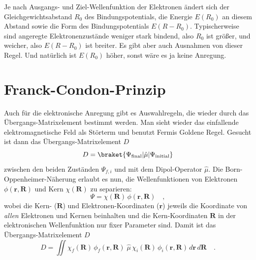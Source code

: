 Je nach Ausgangs- und Ziel-Wellenfunktion der Elektronen ändert sich der Gleichgewichtsabstand $R_0$ des Bindungspotentials,  die Energie $E(R_0)$ an diesem 
Abstand sowie die Form des Bindungspotentials $E(R- R_0)$. Typischerweise  sind angeregte Elektronenzustände weniger stark bindend, also $R_0$ ist größer, und weicher, also $E(R- R_0)$ ist breiter. Es gibt aber auch Ausnahmen von dieser Regel.
Und natürlich ist $E(R_0)$ höher, sonst wäre es ja keine Anregung.

\section{Franck-Condon-Prinzip}


Auch für die elektronische Anregung gibt es Auswahlregeln, die wieder durch das Übergangs-Matrixelement bestimmt werden. Man sieht wieder das einfallende elektromagnetische  Feld als Störterm und benutzt Fermis Goldene Regel. Gesucht ist dann das Übergangs-Matrixelement $D$
\begin{equation}
 D = \braket{\Psi_\text{final} | \hat{\mu} | \Psi_\text{initial} }
\end{equation}
zwischen den beiden Zuständen $\Psi_{f,i}$ und mit dem Dipol-Operator $ \hat{\mu}$. Die Born-Oppenheimer-Näherung erlaubt es nun, die Wellenfunktionen von Elektronen $ \phi(\mathbf{r}, \mathbf{R})$ und Kern $ \chi(\mathbf{R}) $ zu separieren:
\begin{equation}
 \Psi = \chi(\mathbf{R}) \, \phi(\mathbf{r}, \mathbf{R}) \quad , \label{eq:elec_wf_FC}
\end{equation}
wobei die Kern- ($\mathbf{R}$) und Elektronen-Koordinaten ($\mathbf{r}$) jeweils die Koordinate von \emph{allen} Elektronen und Kernen beinhalten und die Kern-Koordinaten $\mathbf{R}$ in der elektronischen Wellenfunktion nur fixer Parameter sind. Damit ist das Übergangs-Matrixelement $D$
\begin{equation}
 D =  \iint  \chi_f(\mathbf{R}) \, \phi_f(\mathbf{r} , \mathbf{R}) \; \hat{\mu}
 \,  \chi_i(\mathbf{R}) \, \phi_i(\mathbf{r}, \mathbf{R}) \, d \mathbf{r} \, d \mathbf{R}  \quad .
\end{equation}


